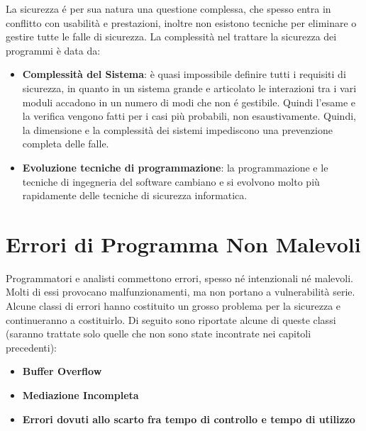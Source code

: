 La sicurezza é per sua natura una questione complessa, che spesso entra in conflitto con usabilità e prestazioni, inoltre non esistono tecniche per eliminare o gestire tutte le falle di sicurezza.
La complessità nel trattare la sicurezza dei programmi è data da:

\begin{itemize}
\item \textbf{Complessità del Sistema}: è quasi impossibile definire tutti i requisiti di sicurezza, in quanto in un sistema grande e articolato le interazioni tra i vari moduli accadono in un numero di modi che non é gestibile. Quindi l'esame e la verifica vengono fatti per i casi più probabili, non esaustivamente. Quindi, la dimensione e la complessità dei sistemi impediscono una prevenzione completa delle falle.
\item \textbf{Evoluzione tecniche di programmazione}: la programmazione e le tecniche di ingegneria del software cambiano e si evolvono molto più rapidamente delle tecniche di sicurezza informatica.
\end{itemize}

\section{Errori di Programma Non Malevoli}
Programmatori e analisti commettono errori, spesso né intenzionali né malevoli. Molti di essi provocano malfunzionamenti, ma non portano a vulnerabilità serie. Alcune classi di errori hanno costituito un grosso problema per la sicurezza e continueranno a costituirlo. 
Di seguito sono riportate alcune di queste classi (saranno trattate solo quelle che non sono state incontrate nei capitoli precedenti):

\begin{itemize}
\item \textbf{Buffer Overflow}
\item \textbf{Mediazione Incompleta}
\item \textbf{Errori dovuti allo scarto fra tempo di controllo e tempo di utilizzo}
\end{itemize}

